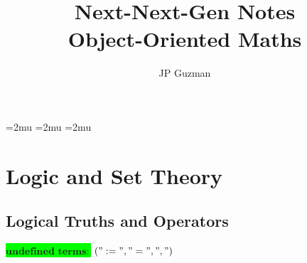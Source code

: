 \documentclass[a4paper]{article}
\title{Next-Next-Gen Notes \\
\large Object-Oriented Maths}
\author{JP Guzman}
\newcommand{\tdb}[1]{\colorbox{lime}{$\displaystyle #1$}}
\newcommand{\defeq}{:=}
\begin{document}
\maketitle
\allowdisplaybreaks


\thinmuskip=2mu %
\medmuskip=2mu %
\thickmuskip=2mu %
\setlength{\belowdisplayskip}{0pt} \setlength{\belowdisplayshortskip}{0pt}
\setlength{\abovedisplayskip}{0pt} \setlength{\abovedisplayshortskip}{0pt}


\section{Logic and Set Theory}
\subsection{Logical Truths and Operators}
\tdb{\textbf{undefined terms}:} $%
   ("\defeq", "=", ",") %
$
\end{document}
